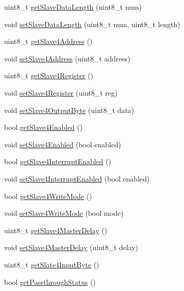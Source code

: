 \begin{DoxyCompactItemize}
\item 
uint8\+\_\+t \hyperlink{class_m_p_u6050_a54c2a48b3cb79106bcaf75accf6cd311}{get\+Slave\+Data\+Length} (uint8\+\_\+t num)
\item 
void \hyperlink{class_m_p_u6050_ab4151353f433c533246d938fc3b78458}{set\+Slave\+Data\+Length} (uint8\+\_\+t num, uint8\+\_\+t length)
\item 
uint8\+\_\+t \hyperlink{class_m_p_u6050_a4278dec5fec25be9a6f45b51a3373ad2}{get\+Slave4\+Address} ()
\item 
void \hyperlink{class_m_p_u6050_a6985da2cbc37be3fefbe3c16bf8d34a6}{set\+Slave4\+Address} (uint8\+\_\+t address)
\item 
uint8\+\_\+t \hyperlink{class_m_p_u6050_a7bd548cb60ecceb27c72f026ec0a60f8}{get\+Slave4\+Register} ()
\item 
void \hyperlink{class_m_p_u6050_ae54dc358da048e61a1ac68012300fdaa}{set\+Slave4\+Register} (uint8\+\_\+t reg)
\item 
void \hyperlink{class_m_p_u6050_a17147a6f477be79f58889e9e6329392f}{set\+Slave4\+Output\+Byte} (uint8\+\_\+t data)
\item 
bool \hyperlink{class_m_p_u6050_a4b9e13d6776ba99e042773873557bedd}{get\+Slave4\+Enabled} ()
\item 
void \hyperlink{class_m_p_u6050_a04be2a8c3af6ef174f97769b9b5164a9}{set\+Slave4\+Enabled} (bool enabled)
\item 
bool \hyperlink{class_m_p_u6050_a051549bcfa2eeb848c8557fc3efe74da}{get\+Slave4\+Interrupt\+Enabled} ()
\item 
void \hyperlink{class_m_p_u6050_a7d7498ebc26f8a1fe8c9dcf40cd5d265}{set\+Slave4\+Interrupt\+Enabled} (bool enabled)
\item 
bool \hyperlink{class_m_p_u6050_a8d5a5e73907c78960154b92656127372}{get\+Slave4\+Write\+Mode} ()
\item 
void \hyperlink{class_m_p_u6050_af1402fe7f3e1cc0dedb6714351cbca4e}{set\+Slave4\+Write\+Mode} (bool mode)
\item 
uint8\+\_\+t \hyperlink{class_m_p_u6050_a9a4585b3c9e61478db198011107a56a9}{get\+Slave4\+Master\+Delay} ()
\item 
void \hyperlink{class_m_p_u6050_ac154934a43c599cdc564fb29c22c45eb}{set\+Slave4\+Master\+Delay} (uint8\+\_\+t delay)
\item 
uint8\+\_\+t \hyperlink{class_m_p_u6050_a9bc93f34bc3d85cbe6010b4a3a88c5a7}{get\+Slate4\+Input\+Byte} ()
\item 
bool \hyperlink{class_m_p_u6050_af2820067b73f177d985ed81e894281b0}{get\+Passthrough\+Status} ()

\end{DoxyCompactItemize}
